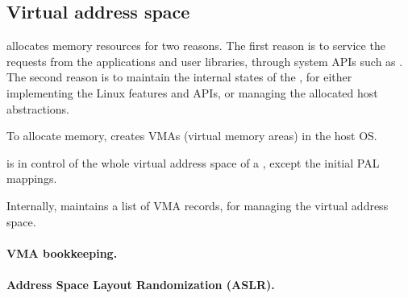 \subsection{Virtual address space}
\label{sec:libos:vma}

\thelibos{} allocates memory resources
for two reasons.
The first reason is to service the requests from the applications and user libraries,
through 
system APIs such as .
The second reason
is to maintain the internal states
of the \libos{},
for either implementing the Linux features and APIs, or managing the allocated host abstractions.



To allocate memory, \thelibos{} creates VMAs (virtual memory areas)
in the host OS.



\thelibos{} is in control of the whole virtual address space of a \picoproc{},
except the initial PAL mappings.








Internally, \thelibos{} maintains a list of VMA records, for managing the virtual address space.





\paragraph{VMA bookkeeping.}




\paragraph{Address Space Layout Randomization (ASLR).}

